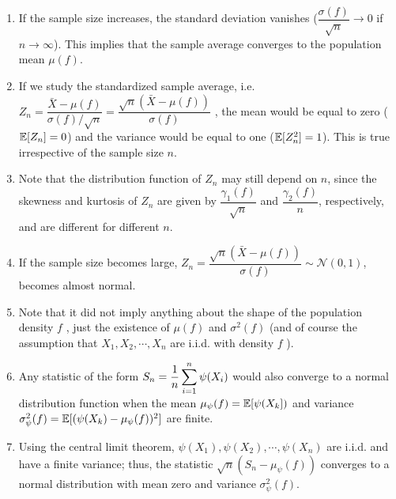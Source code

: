 \begin{enumerate}
    \item  If the sample size increases, the standard deviation vanishes ($\dfrac{\sigma (f)}{\sqrt{n}} \to 0$ if $n \to \infty$).
    This implies that the sample average converges to the population mean $\mu( f )$.
    \hfill \cite{statistics/book/Statistics-for-Data-Scientists/Maurits-Kaptein}

    \item
    \begin{theorem}
        If we study the standardized sample average, i.e.
        $
            Z _n
            = \dfrac{\bar{X} - \mu ( f )}{\sigma  ( f )/\sqrt{n}}
            = \dfrac{\sqrt{n}( \bar{X} - \mu ( f ))}{\sigma  ( f )}
        $
        , the mean would be equal to zero ($\mathbb{E}[Z _n] = 0$) and the variance would be equal to one ($\mathbb{E}[Z ^2 _n] = 1$).
        This is true irrespective of the sample size $n$.
        \hfill \cite{statistics/book/Statistics-for-Data-Scientists/Maurits-Kaptein}
    \end{theorem}

    \item Note that the distribution function of $Z _n$ may still depend on $n$, since the skewness and kurtosis of $Z _n$ are given by $\dfrac{\gamma_1( f )}{\sqrt{n}}$ and $\dfrac{\gamma_2( f )}{n}$, respectively, and are different for different $n$.
    \hfill \cite{statistics/book/Statistics-for-Data-Scientists/Maurits-Kaptein}

    \item If the sample size becomes large, $Z _n = \dfrac{\sqrt{n}( \bar{X} - \mu ( f ))}{\sigma  ( f )} \sim \mathcal{N} (0, 1)$, becomes almost normal.
    \hfill \cite{statistics/book/Statistics-for-Data-Scientists/Maurits-Kaptein}

    \item Note that it did not imply anything about the shape of the population density $f$ , just the existence of $\mu( f )$ and $\sigma^ 2( f )$ (and of course the assumption that $X_1 , X_2, \cdots , X _n$ are i.i.d. with density $f$ ).
    \hfill \cite{statistics/book/Statistics-for-Data-Scientists/Maurits-Kaptein}

    \item Any statistic of the form $S_n = \dfrac{1}{n} \displaystyle\sum^n _{i=1} \psi(X _i )$ would also converge to a normal distribution function when the mean $\mu_\psi ( f ) = \mathbb{E}[\psi(X _k])$ and variance $\sigma ^2 _\psi  ( f ) = \mathbb{E}[(\psi (X _k ) - \mu_\psi  ( f ))^2]$ are finite.
    \hfill \cite{statistics/book/Statistics-for-Data-Scientists/Maurits-Kaptein}

    \item Using the central limit theorem, $\psi (X_1), \psi (X_2), \cdots , \psi (X_ n )$ are i.i.d. and have a finite variance; thus, the statistic $\sqrt{n}(S_n - \mu_\psi  ( f ))$ converges to a normal distribution with mean zero and variance $\sigma^ 2 _\psi  ( f )$.
    \hfill \cite{statistics/book/Statistics-for-Data-Scientists/Maurits-Kaptein}
\end{enumerate}



